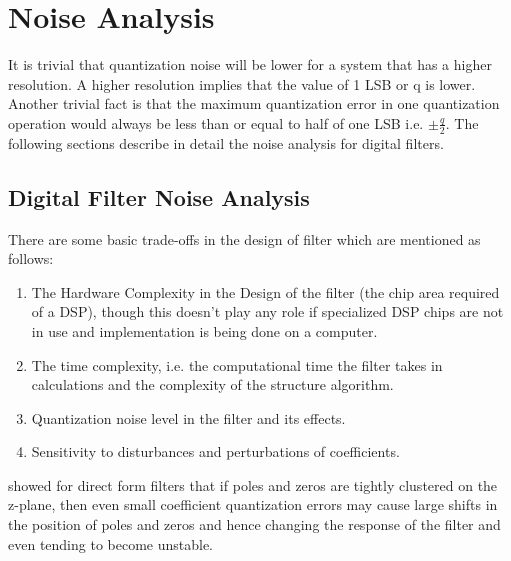 \documentclass[a4paper,12pt]{article}
\begin{document}
%
\section{Noise Analysis}
\label{analysis}
It is trivial that quantization noise will be lower for a system that has a higher resolution. A higher resolution implies that the value of 1 LSB  or q is lower. Another trivial fact is that the maximum quantization error in one quantization operation would always be less than or equal to half of one LSB i.e. $\pm\frac{q}{2}$. The following sections describe in detail the noise analysis for digital filters.

	\subsection{Digital Filter Noise Analysis}
    There are some basic trade-offs in the design of filter which are mentioned as follows: 
		\begin{enumerate}
		\item The Hardware Complexity in the Design of the filter (the chip area required of a DSP), though this doesn't play any role if specialized DSP chips are not in use and implementation is being done on a computer. 
		\item The time complexity, i.e. the computational time the filter takes in calculations and the complexity of the structure algorithm.
		\item Quantization noise level in the filter and its effects.
		\item Sensitivity to disturbances and perturbations of coefficients. 
		\end{enumerate}
\cite{Kaiser} showed for direct form filters that if poles and zeros are tightly clustered on the z-plane, then even small coefficient quantization errors may cause large shifts in the position of poles and zeros and hence changing the response of the filter and even tending to become unstable. 
\end{document}
